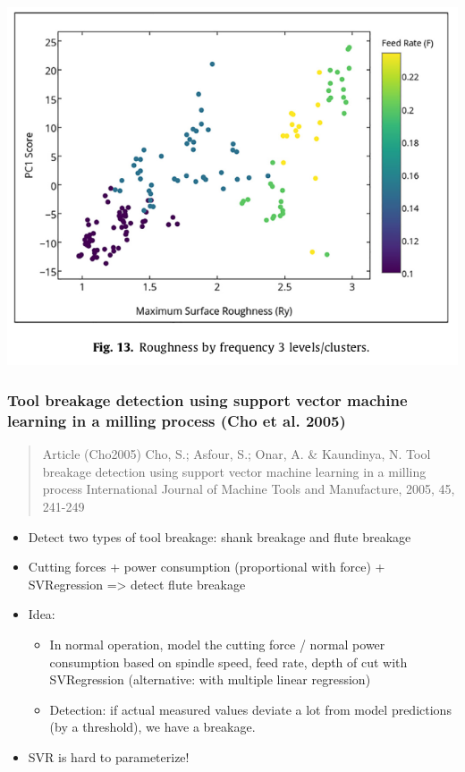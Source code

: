 \documentclass[
  letterpaper,
  DIV=11,
  numbers=noendperiod]{scrartcl}
\providecommand{\tightlist}{%
  \setlength{\itemsep}{0pt}\setlength{\parskip}{0pt}}\usepackage{longtable,booktabs,array}
\begin{document}
\includegraphics{img/2023-01-07-12-16-33.png}

\hypertarget{tool-breakage-detection-using-support-vector-machine-learning-in-a-milling-process-cho2005}{%
\subsubsection{Tool breakage detection using support vector machine
learning in a milling process (Cho et al.
2005)}\label{tool-breakage-detection-using-support-vector-machine-learning-in-a-milling-process-cho2005}}

\begin{quote}
Article (Cho2005) Cho, S.; Asfour, S.; Onar, A. \& Kaundinya, N. Tool
breakage detection using support vector machine learning in a milling
process International Journal of Machine Tools and Manufacture, 2005,
45, 241-249
\end{quote}

\begin{itemize}
\tightlist
\item
  Detect two types of tool breakage: shank breakage and flute breakage
\item
  Cutting forces + power consumption (proportional with force) +
  SVRegression =\textgreater{} detect flute breakage
\item
  Idea:

  \begin{itemize}
  \tightlist
  \item
    In normal operation, model the cutting force / normal power
    consumption based on spindle speed, feed rate, depth of cut with
    SVRegression (alternative: with multiple linear regression)
  \item
    Detection: if actual measured values deviate a lot from model
    predictions (by a threshold), we have a breakage.
  \end{itemize}
\item
  SVR is hard to parameterize!
\end{itemize}
\end{document}
